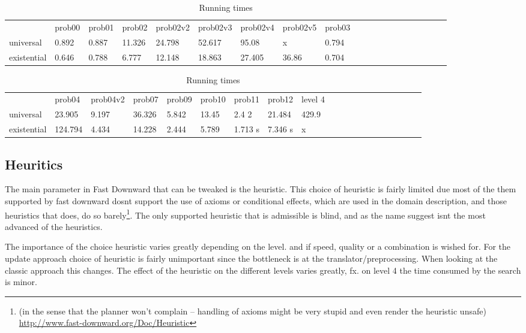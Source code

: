 			\begin{table}[h]
				\centering
				\caption{Running times}
				\label{times}
				\begin{tabular}{llllllllllllllllllll}
					& prob00 & prob01& prob02& prob02v2& prob02v3& prob02v4& prob02v5& prob03\\
					universal 	& 0.892  &0.887  &11.326 &24.798   &52.617   &95.08    & x       &0.794    \\
					existential &0.646   &0.788  &6.777  &12.148   &18.863   &27.405   &36.86    &0.704  \\
				\end{tabular}
				\begin{tabular}{llllllllllllllllllll}
					&  prob04& prob04v2& prob07&  prob09& prob10& prob11& prob12 & level 4\\
					universal    &23.905  &9.197      &36.326   &5.842  &13.45  &2.4 2           &21.484 &429.9\\
					existential      &124.794 &4.434   &14.228 &2.444  &5.789  &1.713 s        &7.346 s & x\\
				\end{tabular}
			\end{table}


\subsection{Heuritics}
The main parameter in Fast Downward that can be tweaked is the heuristic. This choice of heuristic is fairly limited due most of the them supported by fast downward dosnt support the use of axioms or conditional effects, which are used in the domain description, and those heuristics that does, do so barely\footnote{(in the sense that the planner won't complain -- handling of axioms might be very stupid and even render the heuristic unsafe) \url{http://www.fast-downward.org/Doc/Heuristic}}. The only supported heuristic that is admissible is blind, and as the name suggest isnt the most advanced of the heuristics.


The importance of the choice heuristic varies greatly depending on the level. and if speed, quality or a combination is wished for. For the update approach choice of heuristic is fairly unimportant since the bottleneck is at the translator/preprocessing. When looking at the classic approach this changes. The effect of the heuristic on the different levels varies greatly, fx. on level 4 the time consumed by the search is minor.

